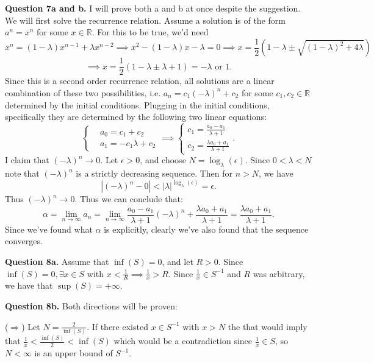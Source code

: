 \documentclass[letterpaper, reqno,11pt]{article}
\begin{document}
{\medskip\noindent\bf Question 7a and b.} I will prove both a and b at once despite the suggestion. We will first solve the recurrence relation. Assume a solution is of the form $a^{n}=x^{n}$ for some $x\in \mathbb{R}$. For this to be true, we'd need
\[
x^{n}=(1-\lambda) x^{n-1}+\lambda x^{n-2}\implies x^2-(1-\lambda) x-\lambda=0\implies x=\frac{1}{2}\left( 1-\lambda\pm \sqrt{(1-\lambda)^2+4\lambda} \right)
\]
\[
\implies x=\frac{1}{2}\left( 1-\lambda\pm \lambda+1 \right) =-\lambda\text{ or }1
.\]
Since this is a second order recurrence relation, all solutions are a linear combination of these two possibilities, i.e. $a_n=c_1(-\lambda)^{n}+c_2$ for some $c_1,c_2\in \mathbb{R}$ determined by the initial conditions. Plugging in the initial conditions, specifically they are determined by the following two linear equations:
\[
\begin{cases}
&a_0=c_1+c_2\\
&a_1=-c_1\lambda+c_2
\end{cases}\implies \begin{cases}
    c_1= \frac{a_0-a_1}{\lambda+1}\\
    c_2=\frac{\lambda a_0+a_1}{\lambda+1}
\end{cases}
.\]
I claim that $(-\lambda)^{n}\to 0$. Let $\epsilon>0$, and choose $N=\log_{\lambda}\left( \epsilon\right) $. Since $0<\lambda<N$ note that $(-\lambda)^{n}$ is a strictly decreasing sequence. Then for $n>N$, we have
\[
\left| (-\lambda)^{n}-0\right|<\left|\lambda\right|^{\log_{\lambda}\left( \epsilon \right) }=\epsilon
.\]
Thus $(-\lambda)^{n}\to 0$. Thus we can conclude that:
\[
\alpha=\lim_{n\to\infty}a_n= \lim_{n\to\infty}\frac{a_0-a_1}{\lambda+1}(-\lambda)^{n}+\frac{\lambda a_0+a_1}{\lambda+1}=\frac{\lambda a_0+a_1}{\lambda+1}
.\]
Since we've found what $\alpha$ is explicitly, clearly we've also found that the sequence converges.

\newpage\phantom{blabla}
\newpage

{\medskip\noindent\bf Question 8a.} Assume that $\inf(S)=0$, and let $R>0$. Since $\inf(S)=0, \exists x\in S$ with $x<\frac{1}{R}\implies \frac{1}{x}>R$. Since $\frac{1}{x}\in S^{-1}$ and $R$ was arbitrary, we have that $\sup(S)=+\infty$.

{\medskip\noindent\bf Question 8b.} Both directions will be proven:

($\Rightarrow$) Let $N=\frac{2}{\inf(S)}$. If there existed $x\in S^{-1}$ with $x>N$ the that would imply that $\frac{1}{x}<\frac{\inf(S)}{2}<\inf(S)$ which would be a contradiction since $\frac{1}{x}\in S$, so $N<\infty$ is an upper bound of $S^{-1}$.
\end{document}
